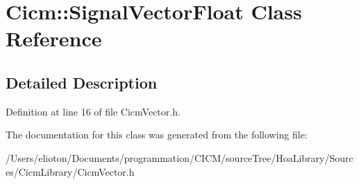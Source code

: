 \hypertarget{class_cicm_1_1_signal_vector_float}{\section{Cicm\-:\-:Signal\-Vector\-Float Class Reference}
\label{class_cicm_1_1_signal_vector_float}
}


\subsection{Detailed Description}


Definition at line 16 of file Cicm\-Vector.\-h.



The documentation for this class was generated from the following file\-:\begin{DoxyCompactItemize}
\item 
/\-Users/elioton/\-Documents/programmation/\-C\-I\-C\-M/source\-Tree/\-Hoa\-Library/\-Sources/\-Cicm\-Library/Cicm\-Vector.\-h\end{DoxyCompactItemize}
